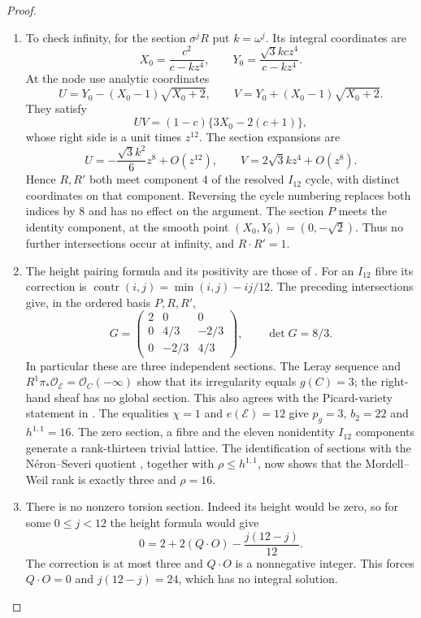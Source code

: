 \begin{proof}
\begin{enumerate}[label=\arabic*.,leftmargin=*]
\item To check infinity, for the section
$\sigma^jR$ put $k=\omega^j$. Its
integral coordinates are
\[
 X_0=\frac{c^2}{c-kz^4},\qquad
 Y_0=\frac{\sqrt3kc z^4}{c-kz^4}.
\]
At the node use analytic coordinates
\[
 U=Y_0-(X_0-1)\sqrt{X_0+2},\qquad
 V=Y_0+(X_0-1)\sqrt{X_0+2}.
\]
They satisfy
\[
 UV=(1-c)\{3X_0-2(c+1)\},
\]
whose right side is a unit times $z^{12}$.
The section expansions are
\[
 U=-\frac{\sqrt3k^2}{6}z^8+O(z^{12}),
 \qquad V=2\sqrt3kz^4+O(z^8).
\]
Hence $R,R'$ both meet component $4$
of the resolved $I_{12}$ cycle, with
distinct coordinates on that component.
Reversing the cycle numbering replaces
both indices by $8$ and has no effect
on the argument. The section $P$ meets
the identity component, at the smooth
point $(X_0,Y_0)=(0,-\sqrt2)$.
Thus no further intersections occur at
infinity, and $R\cdot R'=1$.

\item The height pairing formula and its
positivity are those of
\cite[Theorems~8.4 and~8.6, table~(8.16), pp.~227--229]{Shioda90}.
For an $I_{12}$ fibre its correction is
$\operatorname{contr}(i,j)=\min(i,j)-ij/12$.
The preceding intersections give, in
the ordered basis $P,R,R'$,
\[
 G=\begin{pmatrix}
 2&0&0\\
 0&4/3&-2/3\\
 0&-2/3&4/3
 \end{pmatrix},\qquad \det G=8/3.
\]
In particular these are three independent
sections. The Leray sequence and
$R^1\pi_*\mathcal O_{\mathscr E}
=\mathcal O_C(-\infty)$ show that its
irregularity equals $g(C)=3$; the
right-hand sheaf has no global section.
This also agrees with the Picard-variety
statement in \cite[Theorem~4.1, pp.~219--220]{Shioda90}.
The equalities $\chi=1$ and
$e(\mathscr E)=12$ give $p_g=3$,
$b_2=22$ and $h^{1,1}=16$.
The zero section, a fibre and the eleven
nonidentity $I_{12}$ components generate
a rank-thirteen trivial lattice.
The identification of sections with
the N\'eron--Severi quotient
\cite[Theorem~1.3, p.~214]{Shioda90}, together
with $\rho\le h^{1,1}$, now shows that
the Mordell--Weil rank is exactly three
and $\rho=16$.

\item There is no nonzero torsion section.
Indeed its height would be zero, so
for some $0\le j<12$ the height formula
would give
\[
 0=2+2(Q\cdot O)-\frac{j(12-j)}{12}.
\]
The correction is at most three and
$Q\cdot O$ is a nonnegative integer.
This forces $Q\cdot O=0$ and
$j(12-j)=24$, which has no integral
solution.


\end{enumerate}
\end{proof}
